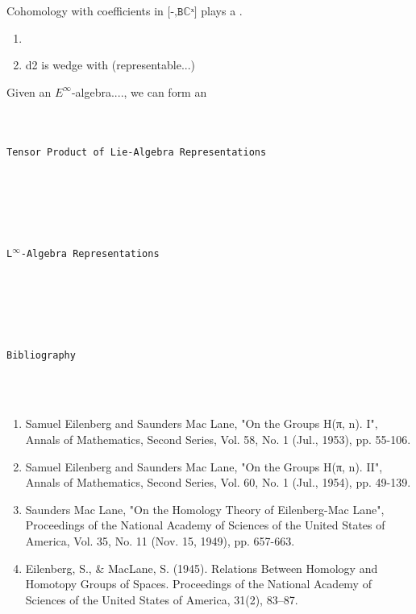 \documentclass{book}
\theoremstyle{definition}
\renewcommand{\chapter}[1]{
\newpage
{
\Huge 
\begin{center}
\ \\
\ \\
\thispagestyle{empty}
\texttt{#1}
\end{center}}
\ \\
\ \\
}
\begin{document}
Cohomology with coefficients in $\texttt{[-,Bℂˣ]}$ plays a .\\

\begin{enumerate}
\item 
\item d2 is wedge with (representable...)
\end{enumerate}

Given an $E^{\infty}$-algebra...., we can form an \\

\newpage
\chapter{Tensor Product of Lie-Algebra Representations}




\newpage
\chapter{L${}^{\infty}$-Algebra Representations}




\newpage
\chapter{Bibliography}

\begin{enumerate}
\item Samuel Eilenberg and Saunders Mac Lane, "On the Groups H(π, n). I", Annals of Mathematics, Second Series, Vol. 58, No. 1 (Jul., 1953), pp. 55-106.
\item Samuel Eilenberg and Saunders Mac Lane, "On the Groups H(π, n). II", Annals of Mathematics, Second Series, Vol. 60, No. 1 (Jul., 1954), pp. 49-139.
\item Saunders Mac Lane, "On the Homology Theory of Eilenberg-Mac Lane", Proceedings of the National Academy of Sciences of the United States of America, Vol. 35, No. 11 (Nov. 15, 1949), pp. 657-663.
\item Eilenberg, S., \& MacLane, S. (1945). Relations Between Homology and Homotopy Groups of Spaces. Proceedings of the National Academy of Sciences of the United States of America, 31(2), 83–87. 
\end{enumerate}
\end{document}
